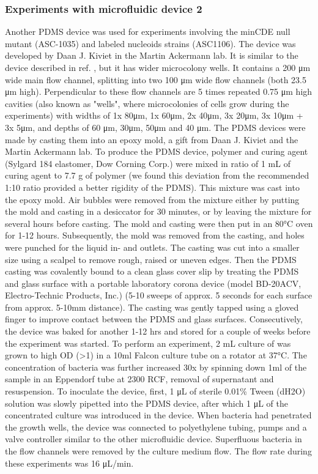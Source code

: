 \subsubsection{Experiments with microfluidic device 2}
Another PDMS device was used for experiments involving the minCDE null mutant (ASC-1035) and labeled nucleoids strains (ASC1106). The device was developed by Daan J. Kiviet in the Martin Ackermann lab. It is similar to the device described in ref. \cite{Taheri-Araghi2014}, but it has wider microcolony wells. It contains a 200 μm wide main flow channel, splitting into two 100 μm wide flow channels (both 23.5 μm high). Perpendicular to these flow channels are 5 times repeated 0.75 μm high cavities (also known as "wells", where microcolonies of cells grow during the experiments) with widths of 1x 80μm, 1x 60μm, 2x 40μm, 3x 20μm, 3x 10μm + 3x 5μm, and depths of 60 μm, 30μm, 50μm and 40 μm. The PDMS devices were made by casting them into an epoxy mold, a gift from Daan J. Kiviet and the Martin Ackermann lab.
To produce the PDMS device, polymer and curing agent (Sylgard 184 elastomer, Dow Corning Corp.) were mixed in ratio of 1 mL of curing agent to 7.7 g of polymer (we found this deviation from the recommended 1:10 ratio provided a better rigidity of the PDMS). This mixture was cast into the epoxy mold. Air bubbles were removed from the mixture either by putting the mold and casting in a desiccator for 30 minutes, or by leaving the mixture for several hours before casting. The mold and casting were then put in an 80°C oven for 1-12 hours. Subsequently, the mold was removed from the casting, and holes were punched for the liquid in- and outlets. The casting was cut into a smaller size using a scalpel to remove rough, raised or uneven edges. Then the PDMS casting was covalently bound to a clean glass cover slip by treating the PDMS and glass surface with a portable laboratory corona device (model BD-20ACV, Electro-Technic Products, Inc.) (5-10 sweeps of approx. 5 seconds for each surface from approx. 5-10mm distance). The casting was gently tapped using a gloved finger to improve contact between the PDMS and glass surfaces. Consecutively, the device was baked for another 1-12 hrs and stored  for a couple of weeks before the experiment was started. 
To perform an experiment, 2 mL culture of \ecoli was grown to high OD (>1) in a 10ml Falcon culture tube on a rotator at 37°C. The concentration of bacteria was further increased 30x by spinning down 1ml of the sample in an Eppendorf tube at 2300 RCF, removal of supernatant and resuspension. To inoculate the device, first, 1 μL of sterile 0.01\% Tween (dH2O) solution was slowly pipetted into the PDMS device, after which 1 μL of the concentrated culture was introduced in the device. When bacteria had penetrated the growth wells, the device was connected to polyethylene tubing, pumps and a valve controller similar to the other microfluidic device. Superfluous bacteria in the flow channels were removed by the culture medium flow. The flow rate during these experiments was 16 μL/min.

